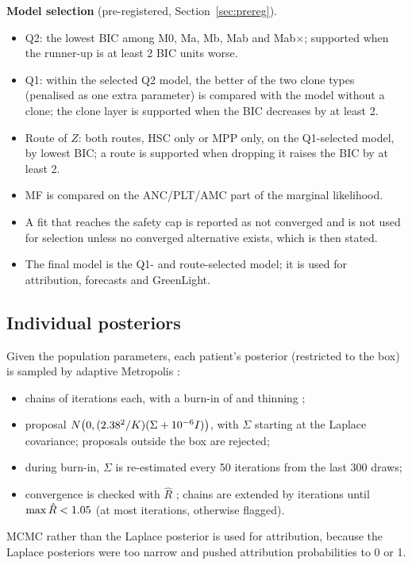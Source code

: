 \documentclass[11pt]{article}
\begin{document}


\textbf{Model selection} (pre-registered, Section~\ref{sec:prereg}).
\begin{itemize}
\item Q2: the lowest BIC among M0, Ma, Mb, Mab and Mab$\times$; supported when the runner-up is at least 2 BIC units worse.
\item Q1: within the selected Q2 model, the better of the two clone types (penalised as one extra parameter) is compared with the model without a clone; the clone layer is supported when the BIC decreases by at least 2.
\item Route of $Z$: both routes, HSC only or MPP only, on the Q1-selected model, by lowest BIC; a route is supported when dropping it raises the BIC by at least 2.
\item MF is compared on the ANC/PLT/AMC part of the marginal likelihood.
\item A fit that reaches the safety cap is reported as not converged and is not used for selection unless no converged alternative exists, which is then stated.
\item The final model is the Q1- and route-selected model; it is used for attribution, forecasts and GreenLight.
\end{itemize}

\subsection{Individual posteriors}
Given the population parameters, each patient's posterior (restricted to the box) is sampled by adaptive Metropolis \citep{haario2001}:
\begin{itemize}
\item \valChains{} chains of \valIter{} iterations each, with a burn-in of \valBurn{} and thinning \valThin;
\item proposal $N\bigl(0,(2.38^2/K)(\Sigma+10^{-6}I)\bigr)$, with $\Sigma$ starting at the Laplace covariance; proposals outside the box are rejected;
\item during burn-in, $\Sigma$ is re-estimated every 50 iterations from the last 300 draws;
\item convergence is checked with $\hat R$ \citep{gelman1992}; chains are extended by \valMcmcExtend{} iterations until $\max\hat R<1.05$ (at most \valMcmcMax{} iterations, otherwise flagged).
\end{itemize}
MCMC rather than the Laplace posterior is used for attribution, because the Laplace posteriors were too narrow and pushed attribution probabilities to 0 or 1.
\end{document}
